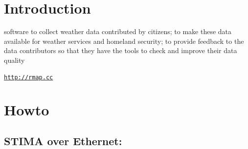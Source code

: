 \hypertarget{index_introduction}{}\section{Introduction}\label{index_introduction}
software to collect weather data contributed by citizens; to make these data available for weather services and homeland security; to provide feedback to the data contributors so that they have the tools to check and improve their data quality

\href{http://rmap.cc}{\tt http\+://rmap.\+cc}\hypertarget{index_howto}{}\section{Howto}\label{index_howto}
\hypertarget{index_stima_ethernet}{}\subsection{S\+T\+I\+M\+A over Ethernet\+:}\label{index_stima_ethernet}
 
